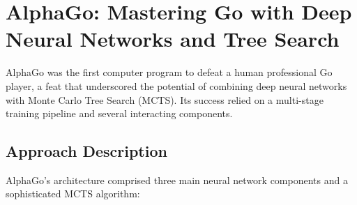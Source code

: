 \documentclass[11pt,a4paper]{article}
\begin{document}
\section{AlphaGo: Mastering Go with Deep Neural Networks and Tree Search}
AlphaGo \cite{alphago} was the first computer program to defeat a human professional Go player, a feat that underscored the potential of combining deep neural networks with Monte Carlo Tree Search (MCTS). Its success relied on a multi-stage training pipeline and several interacting components.

\subsection{Approach Description}
AlphaGo's architecture comprised three main neural network components and a sophisticated MCTS algorithm:
\end{document}
